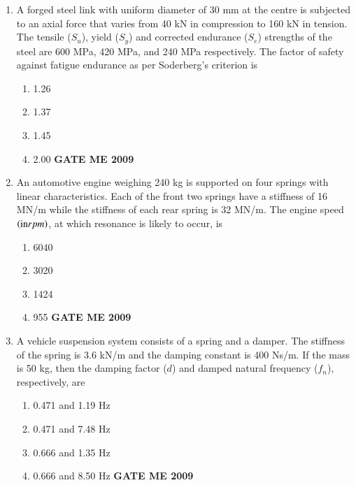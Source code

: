 \documentclass[journal]{IEEEtran}
\begin{document}
\begin{enumerate}[leftmargin=0pt]
\item A forged steel link with uniform diameter of 30 mm at the centre is subjected to an axial force that varies from 40 kN in compression to 160 kN in tension. The tensile ($S_u$), yield ($S_y$) and corrected endurance ($S_e$) strengths of the steel are 600 MPa, 420 MPa, and 240 MPa respectively. The factor of safety against fatigue endurance as per Soderberg's criterion is
\begin{enumerate}[label=(\Alph*)]
  \item 1.26
  \item 1.37
  \item 1.45
  \item 2.00
\hfill{\textbf{GATE ME 2009}}
\end{enumerate}

\item An automotive engine weighing 240 kg is supported on four springs with linear characteristics. Each of the front two springs have a stiffness of 16 MN/m while the stiffness of each rear spring is 32 MN/m. The engine speed $\left(\text{in} rpm\right)$, at which resonance is likely to occur, is
\begin{enumerate}[label=(\Alph*)]
  \item 6040
  \item 3020
  \item 1424
  \item 955
\hfill{\textbf{GATE ME 2009}}
\end{enumerate}

\item A vehicle suspension system consists of a spring and a damper. The stiffness of the spring is 3.6 kN/m and the damping constant is 400 Ns/m. If the mass is 50 kg, then the damping factor ($d$) and damped natural frequency ($f_n$), respectively, are
\begin{enumerate}[label=(\Alph*)]
  \item 0.471 and 1.19 Hz
  \item 0.471 and 7.48 Hz
  \item 0.666 and 1.35 Hz
  \item 0.666 and 8.50 Hz
\hfill{\textbf{GATE ME 2009}}
\end{enumerate}


\end{enumerate}
\end{document}

